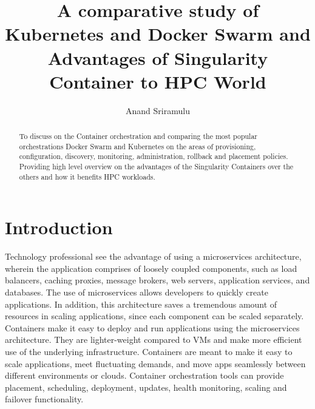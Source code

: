\documentclass[sigconf]{acmart}
\begin{document}
	\title {A comparative study of Kubernetes and Docker Swarm and Advantages of Singularity Container to HPC World}
	
	
	\author{Anand Sriramulu}
	
	
	\renewcommand{\shortauthors}{Anand S}
	
	
	\begin{abstract}
		To discuss on the Container orchestration and comparing the most popular orchestrations Docker Swarm and Kubernetes on the areas of provisioning, configuration, discovery, monitoring, administration, rollback and placement policies. Providing high level overview on the advantages of the Singularity Containers over the others and how it benefits HPC workloads.
	\end{abstract}
	
	
	\maketitle
	
	\section{Introduction}
	Technology professional see the advantage of using a microservices architecture, wherein the application comprises of loosely coupled
	components, such as load balancers, caching proxies, message brokers, web servers, application services, and databases.
	The use of microservices allows developers to quickly create applications. In addition, this architecture saves a tremendous
	amount of resources in scaling applications, since each component can be scaled separately.
	Containers make it easy to deploy and run applications using the microservices architecture. They are lighter-weight compared
	to VMs and make more efficient use of the underlying infrastructure. Containers are meant to make it easy to scale applications,
	meet fluctuating demands, and move apps seamlessly between different environments or clouds. 
	Container orchestration tools can provide placement, scheduling, deployment, updates, health monitoring, scaling and failover functionality. 
	\cite{Container-Orchestration}	
\end{document}
